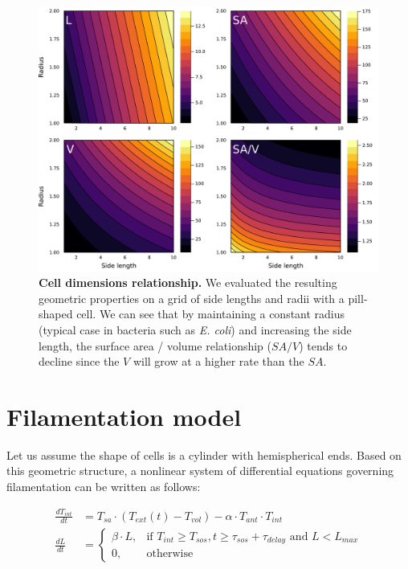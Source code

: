 \documentclass[a4paper, nobind]{templates/ociamthesis}
\begin{document}
\begin{figure}[H]
\includegraphics[width=1\linewidth]{downloadFigs4latex__main/cell-dimensions-relationship} \caption[Cell dimensions relationship.]{\textbf{Cell dimensions relationship.} We evaluated the resulting geometric properties on a grid of side lengths and radii with a pill-shaped cell. We can see that by maintaining a constant radius (typical case in bacteria such as \emph{E. coli}) and increasing the side length, the surface area / volume relationship (\(SA/V\)) tends to decline since the \(V\) will grow at a higher rate than the \(SA\).}\label{fig:cell-dimensions-relationship}
\end{figure}

\hypertarget{filamentation-model}{%
\section{Filamentation model}\label{filamentation-model}}

Let us assume the shape of cells is a cylinder with hemispherical ends. Based on this geometric structure, a nonlinear system of differential equations governing filamentation can be written as follows:

\begin{equation}
\begin{split}
\frac{dT_{int}}{dt} &= T_{sa} \cdot (T_{ext}(t) - T_{vol}) - \alpha \cdot T_{ant} \cdot T_{int} \\
\frac{dL}{dt} &= 
  \begin{cases} 
    \beta \cdot L,& \text{if } T_{int} \geq T_{sos},  t \geq \tau_{sos} + \tau_{delay} \text{ and } L < L_{max}  \\
    0,            & \text{otherwise}
  \end{cases}
\end{split}
\label{eq:model-equation}
\end{equation}
\end{document}

